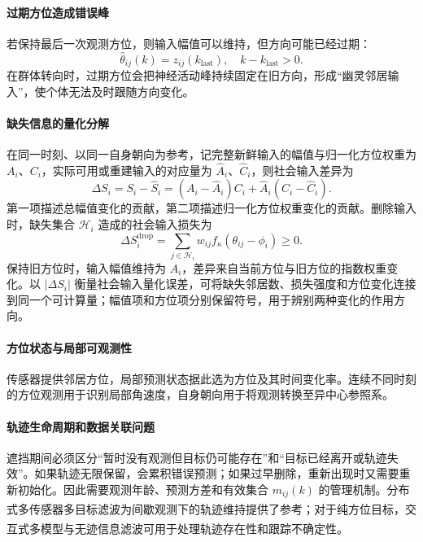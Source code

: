 \documentclass[UTF8,fontset=windows,11pt]{ctexart}
\newcommand{\upcite}[1]{\textsuperscript{\cite{#1}}}
\begin{document}
\paragraph{过期方位造成错误峰}
若保持最后一次观测方位，则输入幅值可以维持，但方向可能已经过期：
\begin{equation}
 \hat\theta_{ij}(k)=z_{ij}(k_{\mathrm{last}}),
\quad k-k_{\mathrm{last}}>0.
\end{equation}
在群体转向时，过期方位会把神经活动峰持续固定在旧方向，形成“幽灵邻居输入”，使个体无法及时跟随方向变化。

\paragraph{缺失信息的量化分解}

在同一时刻、以同一自身朝向为参考，记完整新鲜输入的幅值与归一化方位权重为 $A_i$、$C_i$，实际可用或重建输入的对应量为 $\widehat A_i$、$\widehat C_i$，则社会输入差异为
\begin{equation}
 \Delta S_i=S_i-\widehat S_i
 =(A_i-\widehat A_i)C_i
 +\widehat A_i(C_i-\widehat C_i).
 \label{eq:missing_input_decomposition}
\end{equation}
第一项描述总幅值变化的贡献，第二项描述归一化方位权重变化的贡献。删除输入时，缺失集合 $\mathcal H_i$ 造成的社会输入损失为
\begin{equation}
 \Delta S_i^{\mathrm{drop}}=
 \sum_{j\in\mathcal H_i}w_{ij}f_\kappa(\theta_{ij}-\phi_i)\geq0.
\end{equation}
保持旧方位时，输入幅值维持为 $A_i$，差异来自当前方位与旧方位的指数权重变化。以 $|\Delta S_i|$ 衡量社会输入量化误差，可将缺失邻居数、损失强度和方位变化连接到同一个可计算量；幅值项和方位项分别保留符号，用于辨别两种变化的作用方向。

\paragraph{方位状态与局部可观测性}
传感器提供邻居方位，局部预测状态据此选为方位及其时间变化率。连续不同时刻的方位观测用于识别局部角速度，自身朝向用于将观测转换至异中心参照系。

\paragraph{轨迹生命周期和数据关联问题}
遮挡期间必须区分“暂时没有观测但目标仍可能存在”和“目标已经离开或轨迹失效”。如果轨迹无限保留，会累积错误预测；如果过早删除，重新出现时又需要重新初始化。因此需要观测年龄、预测方差和有效集合 $m_{ij}(k)$ 的管理机制。分布式多传感器多目标滤波为间歇观测下的轨迹维持提供了参考\upcite{Qi2024}；对于纯方位目标，交互式多模型与无迹信息滤波可用于处理轨迹存在性和跟踪不确定性\upcite{Pan2026}。
\end{document}
